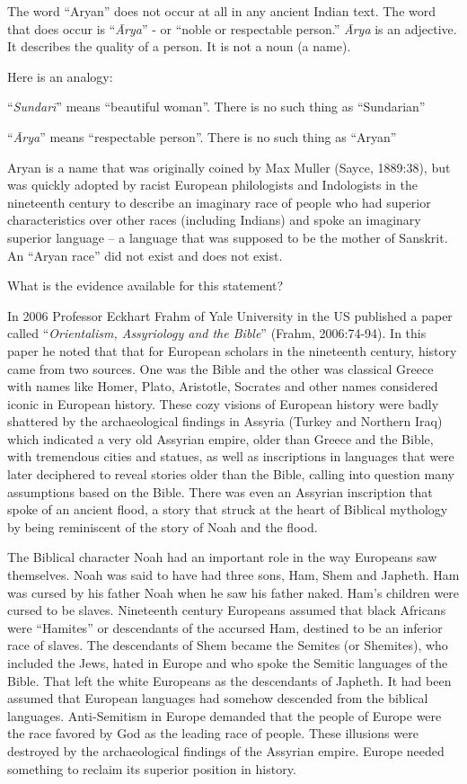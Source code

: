 The word “Aryan” does not occur at all in any ancient Indian text. The word that does occur is “\textit{Ārya}” - or “noble or respectable person.” \textit{Ārya} is an adjective. It describes the quality of a person. It is not a noun (a name).

Here is an analogy:

“\textit{Sundarī}” means “beautiful woman”. There is no such thing as “Sundarian”

“\textit{Ārya}” means “respectable person”. There is no such thing as “Aryan”

Aryan is a name that was originally coined by Max Muller (Sayce, 1889:38), but was quickly adopted by racist European philologists and Indologists in the nineteenth century to describe an imaginary race of people who had superior characteristics over other races (including Indians) and spoke an imaginary superior language – a language that was supposed to be the mother of Sanskrit. An “Aryan race” did not exist and does not exist.

What is the evidence available for this statement?

In 2006 Professor Eckhart Frahm of Yale University in the US published a paper called “\textit{Orientalism, Assyriology and the Bible}” (Frahm, 2006:74-94). In this paper he noted that that for European scholars in the nineteenth century, history came from two sources. One was the Bible and the other was classical Greece with names like Homer, Plato, Aristotle, Socrates and other names considered iconic in European history. These cozy visions of European history were badly shattered by the archaeological findings in Assyria (Turkey and Northern Iraq) which indicated a very old Assyrian empire, older than Greece and the Bible, with tremendous cities and statues, as well as inscriptions in languages that were later deciphered to reveal stories older than the Bible, calling into question many assumptions based on the Bible. There was even an Assyrian inscription that spoke of an ancient flood, a story that struck at the heart of Biblical mythology by being reminiscent of the story of Noah and the flood.

The Biblical character Noah had an important role in the way Europeans saw themselves. Noah was said to have had three sons, Ham, Shem and Japheth. Ham was cursed by his father Noah when he saw his father naked. Ham’s children were cursed to be slaves. Nineteenth century Europeans assumed that black Africans were “Hamites” or descendants of the accursed Ham, destined to be an inferior race of slaves. The descendants of Shem became the Semites (or Shemites), who included the Jews, hated in Europe and who spoke the Semitic languages of the Bible. That left the white Europeans as the descendants of Japheth. It had been assumed that European languages had somehow descended from the biblical languages. Anti-Semitism in Europe demanded that the people of Europe were the race favored by God as the leading race of people. These illusions were destroyed by the archaeological findings of the Assyrian empire. Europe needed something to reclaim its superior position in history.

